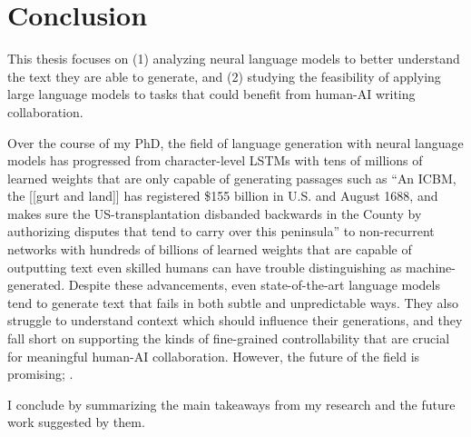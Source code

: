 \chapter{Conclusion}

This thesis focuses on (1) analyzing neural language models to better understand the text they are able to generate, and (2) studying the feasibility of applying large language models to tasks that could benefit from human-AI writing collaboration.

Over the course of my PhD, the field of language generation with neural language models has progressed from character-level LSTMs with tens of millions of learned weights that are only capable of generating passages such as ``{An ICBM, the [[gurt and land]] has registered \$155 billion in U.S. and August 1688, and makes sure the US-transplantation disbanded backwards in the County by authorizing disputes that tend to carry over this peninsula}'' \citep{graves2013generating} to non-recurrent networks with hundreds of billions of learned weights that are capable of outputting text even skilled humans can have trouble distinguishing as machine-generated.
Despite these advancements, even state-of-the-art language models tend to generate text that fails in both subtle and unpredictable ways.
They also struggle to understand context which should influence their generations, and they fall short on supporting the kinds of fine-grained controllability that are crucial for meaningful human-AI collaboration.
However, the future of the field is promising; .

I conclude by summarizing the main takeaways from my research and the future work suggested by them.

